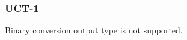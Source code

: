 \subsubsection{UCT-1}\label{sec:error_code_uct_1}

Binary conversion output type is not supported.


